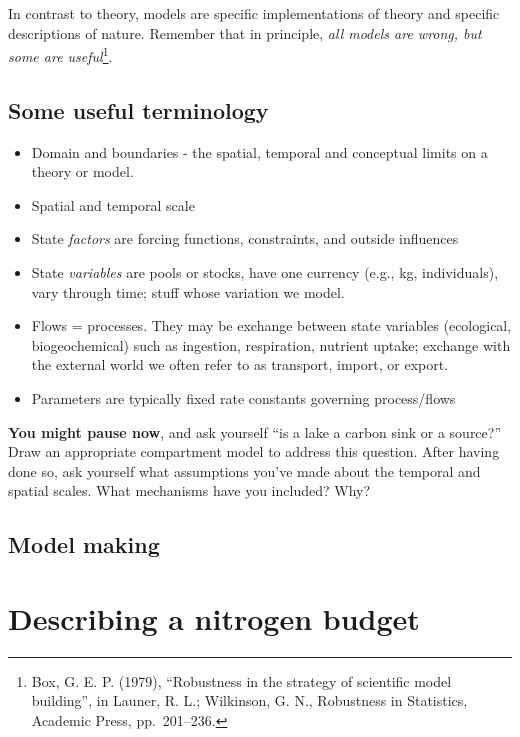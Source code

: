 \documentclass[
]{book}
\providecommand{\tightlist}{%
  \setlength{\itemsep}{0pt}\setlength{\parskip}{0pt}}
\begin{document}
In contrast to theory, models are specific implementations of theory and specific descriptions of nature. Remember that in principle, \emph{all models are wrong, but some are useful}\footnote{Box, G. E. P. (1979), ``Robustness in the strategy of scientific model building'', in Launer, R. L.; Wilkinson, G. N., Robustness in Statistics, Academic Press, pp.~201--236.}.

\hypertarget{some-useful-terminology}{%
\section{Some useful terminology}\label{some-useful-terminology}}

\begin{itemize}
\tightlist
\item
  Domain and boundaries - the spatial, temporal and conceptual limits on a theory or model.
\item
  Spatial and temporal scale
\item
  State \emph{factors} are forcing functions, constraints, and outside influences
\item
  State \emph{variables} are pools or stocks, have one currency (e.g., kg, individuals), vary through time; stuff whose variation we model.
\item
  Flows = processes. They may be exchange between state variables (ecological, biogeochemical) such as ingestion, respiration, nutrient uptake; exchange with the external world we often refer to as transport, import, or export.
\item
  Parameters are typically fixed rate constants governing process/flows
\end{itemize}

\textbf{You might pause now}, and ask yourself ``is a lake a carbon sink or a source?'' Draw an appropriate compartment model to address this question. After having done so, ask yourself what assumptions you've made about the temporal and spatial scales. What mechanisms have you included? Why?

\hypertarget{model-making}{%
\section{Model making}\label{model-making}}

\hypertarget{describing-a-nitrogen-budget}{%
\chapter{Describing a nitrogen budget}\label{describing-a-nitrogen-budget}}
\end{document}
